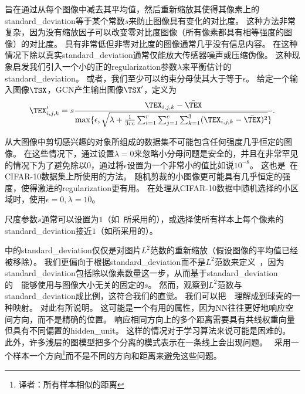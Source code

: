 旨在通过从每个图像中减去其平均值，然后重新缩放其使得其像素上的\gls{standard_deviation}等于某个常数$s$来防止图像具有变化的对比度。
这种方法非常复杂，因为没有缩放因子可以改变零对比度图像（所有像素都具有相等强度的图像）的对比度。
具有非常低但非零对比度的图像通常几乎没有信息内容。
在这种情况下除以真实\gls{standard_deviation}通常仅能放大传感器噪声或压缩伪像。
这种现象启发我们引入一个小的正的\gls{regularization}参数$\lambda$来平衡估计的\gls{standard_deviation}。
或者，我们至少可以约束分母使其大于等于$\epsilon$。
给定一个输入图像$\TSX$，\gls{GCN}产生输出图像$\TSX'$，定义为
\begin{align}
\label{eqn:123}
\TEX'_{i,j,k} = s\frac{\TEX_{i,j,k} - \bar{\TEX}}{\max\{ \epsilon, \sqrt{ \lambda + {\frac{1}{3rc}\sum_{i=1}^{r}\sum_{j=1}^{c}\sum_{k=1}^{3}} (\TEX_{i,j,k} - \bar{\TEX} )^2} \}}.
\end{align}


从大图像中剪切感兴趣的对象所组成的数据集不可能包含任何强度几乎恒定的图像。
在这些情况下，通过设置$\lambda = 0$来忽略小分母问题是安全的，并且在非常罕见的情况下为了避免除以$0$，通过将$\epsilon$设置为一个非常小的值比如说$10^{-8}$。
这也是~\citet{Goodfellow+al-arxiv-2013}在CIFAR-10数据集上所使用的方法。
随机剪裁的小图像更可能具有几乎恒定的强度，使得激进的\gls{regularization}更有用。
在处理从CIFAR-10数据中随机选择的小区域时，\citet{Coates2011}使用$\epsilon = 0, \lambda = 10$。

尺度参数$s$通常可以设置为$1$（如~\citet{Coates2011}所采用的），或选择使所有样本上每个像素的\gls{standard_deviation}接近$1$（如\citet{Goodfellow+al-arxiv-2013}所采用的）。


中的\gls{standard_deviation}仅仅是对图片$L^2$范数的重新缩放（假设图像的平均值已经被移除）。
我们更偏向于根据\gls{standard_deviation}而不是$L^2$范数来定义~，因为\gls{standard_deviation}包括除以像素数量这一步，从而基于\gls{standard_deviation}的~~能够使用与图像大小无关的固定的$s$。
然而，观察到$L^2$范数与\gls{standard_deviation}成比例，这符合我们的直觉。
我们可以把~~理解成到球壳的一种映射。
对此有所说明。
这可能是一个有用的属性，因为\gls{NN}往往更好地响应空间方向，而不是精确的位置。
响应相同方向上的多个距离需要具有共线权重向量但具有不同偏置的\gls{hidden_unit}。
这样的情况对于学习算法来说可能是困难的。
此外，许多浅层的图模型把多个分离的模式表示在一条线上会出现问题。
~采用一个样本一个方向\footnote{译者：所有样本相似的距离}而不是不同的方向和距离来避免这些问题。

